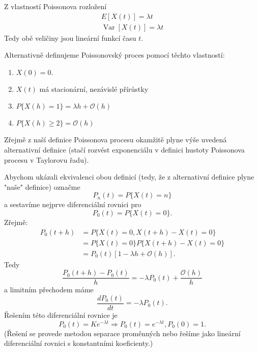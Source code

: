 \documentclass[10pt]{article}
\DeclareMathOperator*{\var}{Var}
\begin{document}
Z vlastností Poissonova rozložení
\begin{equation}
\begin{split}
E[X(t)] = \lambda t\\
\var[X(t)] = \lambda t
\end{split}
\end{equation}
Tedy obě veličiny jsou lineární funkcí času $t$.

Alternativně definujeme Poissonovský proces pomocí těchto vlastností:
\begin{enumerate}
\item $X(0)=0.$
\item $X(t)$ má stacionární, nezávislé přírůstky
\item $P\{X(h)=1\} = \lambda h + \mathcal{O}(h)$
\item $P\{X(h)\geq 2 \} = \mathcal{O}(h)$
\end{enumerate}

Zřejmě z naší definice Poissonova procesu okamžitě plyne výše uvedená alternativní definice (stačí rozvést exponenciálu v definici hustoty Poissonova procesu v Taylorovu řadu).

Abychom ukázali ekvivalenci obou definicí (tedy, že z alternativní definice plyne "naše" definice) označme $$P_n(t) = P\{X(t)=n\}$$ a sestavíme nejprve diferenciální rovnici pro $$P_0(t) = P \{X(t)=0\}.$$ Zřejmě:
\begin{equation}
\begin{split}
P_0(t+h) 	&=P\{X(t)=0,X(t+h)-X(t)=0\}\\
		&=P\{X(t)=0\}P\{X(t+h)-X(t)=0\}\\
		&=P_0(t)[1-\lambda h + \mathcal{O}(h)].
\end{split}
\end{equation}
Tedy $$\frac{P_0(t+h)-P_0(t)}{h}=-\lambda P_0(t) + \frac{\mathcal{O}(h)}{h}$$ a limitním přechodem máme \begin{equation} \label{eq:3a} \frac{dP_0(t)}{dt} = -\lambda P_0(t).\end{equation} Řešením této diferenciální rovnice je $$P_0(t) = Ke^{-\lambda t} \Rightarrow P_0(t) = e^{-\lambda t}, P_0(0) = 1.$$ (Řešení se provede metodou separace proměnných nebo řešíme jako lineární diferenciální rovnici s konstantními koeficienty.)
\end{document}
